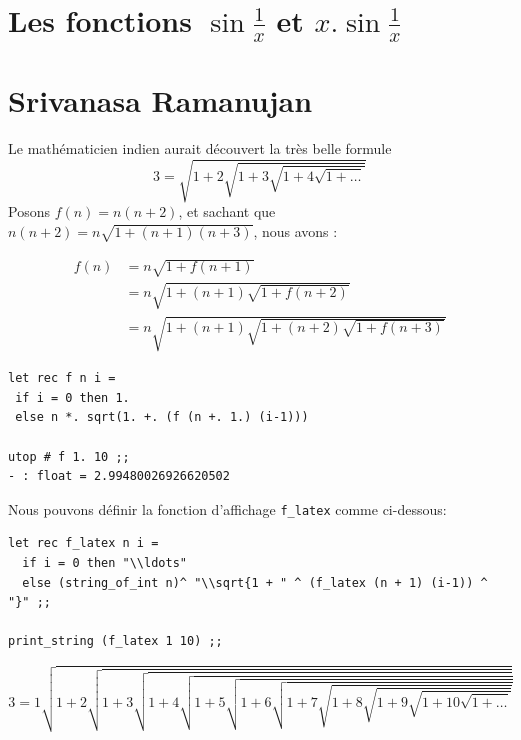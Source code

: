 \documentclass[11pt]{book}
\begin{document}
\section{Les fonctions $\sin \frac{1}{x}$ et $x . \sin \frac{1}{x}$ }
\begin{center}
\hspace{1cm}
\end{center}


\section{Srivanasa Ramanujan}
Le mathématicien indien aurait  découvert la très belle formule 
$$ 3 = \sqrt{1+2\sqrt{1+3\sqrt{1+4\sqrt{1+\ldots}}}} $$
Posons $f(n) = n(n+2)$, et sachant que $n(n+2) = n \sqrt{1+(n+1)(n+3)}$, nous avons :

\begin{align*}
	f(n) &= n\sqrt{1+f(n+1)} \\
	 	 &= n\sqrt{1+(n+1)\sqrt{1+f(n+2)}} \\
	 	 &= n\sqrt{1+(n+1)\sqrt{1+(n+2)\sqrt{1+f(n+3)}}}
\end{align*}

\begin{Verbatim}
let rec f n i =
 if i = 0 then 1.
 else n *. sqrt(1. +. (f (n +. 1.) (i-1)))

utop # f 1. 10 ;;
- : float = 2.99480026926620502
\end{Verbatim}

Nous pouvons définir la fonction d'affichage \verb+f_latex+ comme ci-dessous:
\begin{Verbatim}
let rec f_latex n i =
  if i = 0 then "\\ldots"  
  else (string_of_int n)^ "\\sqrt{1 + " ^ (f_latex (n + 1) (i-1)) ^ "}" ;;

print_string (f_latex 1 10) ;;	
\end{Verbatim}
$$3 = 1\sqrt{1 + 2\sqrt{1 + 3\sqrt{1 + 4\sqrt{1 + 5\sqrt{1 + 6\sqrt{1 + 7\sqrt{1 + 8\sqrt{1 + 9\sqrt{1 + 10\sqrt{1 + \ldots}}}}}}}}}}
$$
\end{document}
